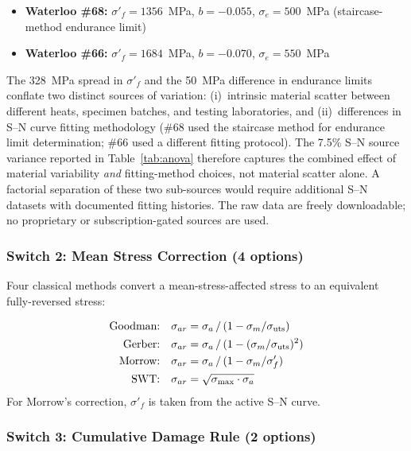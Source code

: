 \documentclass[12pt,a4paper]{article}
\begin{document}
\begin{itemize}
  \item \textbf{Waterloo \#68:} $\sigma'_f = 1356$~MPa, $b=-0.055$,
        $\sigma_e=500$~MPa (staircase-method endurance limit)
  \item \textbf{Waterloo \#66:} $\sigma'_f = 1684$~MPa, $b=-0.070$,
        $\sigma_e=550$~MPa
\end{itemize}

The 328~MPa spread in $\sigma'_f$ and the 50~MPa difference in endurance
limits conflate two distinct sources of variation: (i)~intrinsic
material scatter between different heats, specimen batches, and testing
laboratories, and (ii)~differences in S--N curve fitting methodology
(\#68 used the staircase method for endurance limit determination;
\#66 used a different fitting protocol). The 7.5\% S--N source variance
reported in Table~\ref{tab:anova} therefore captures the combined
effect of material variability \emph{and} fitting-method choices, not
material scatter alone. A factorial separation of these two sub-sources
would require additional S--N datasets with documented fitting
histories. The raw data are freely downloadable; no proprietary or
subscription-gated sources are used.

\subsubsection{Switch 2: Mean Stress Correction (4 options)}

Four classical methods convert a mean-stress-affected stress to an
equivalent fully-reversed stress:

\begin{subequations}\label{eq:mean_stress}
\begin{align}
\text{Goodman:}\quad
  \sigma_{ar} &= \sigma_a \,/\, (1 - \sigma_m/\sigma_{\rm uts})
  \label{eq:goodman} \\
\text{Gerber:}\quad
  \sigma_{ar} &= \sigma_a \,/\, (1 - (\sigma_m/\sigma_{\rm uts})^2)
  \label{eq:gerber} \\
\text{Morrow:}\quad
  \sigma_{ar} &= \sigma_a \,/\, (1 - \sigma_m/\sigma'_f)
  \label{eq:morrow} \\
\text{SWT:}\quad
  \sigma_{ar} &= \sqrt{\sigma_{\max} \cdot \sigma_a}
  \label{eq:swt}
\end{align}
\end{subequations}
For Morrow's correction, $\sigma'_f$ is taken from the active S--N
curve.

\subsubsection{Switch 3: Cumulative Damage Rule (2 options)}
\end{document}
